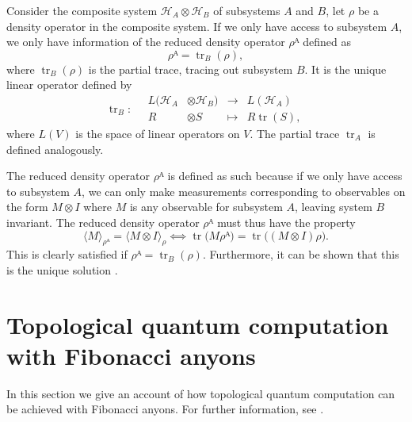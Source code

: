 Consider the composite system $ℋ_A ⊗ ℋ_B$ of subsystems $A$ and $B$, let $ρ$ be a density operator in the composite system. If we only have access to subsystem $A$, we only have information of the reduced density operator $ρᴬ$ defined as
\begin{equation}\label{eq:red dens op}
  ρᴬ = \operatorname{tr}_B(ρ),
\end{equation}
where $\operatorname{tr}_B(ρ)$ is the partial trace, tracing out subsystem $B$. It is the unique linear operator defined by
\begin{equation}
  \operatorname{tr}_B : \quad
  \begin{alignedat}{2}
    L(ℋ_A &⊗ ℋ_B) &{}→{}& L(ℋ_A) \\
    R     &⊗S      &{}↦{}& R\operatorname{tr}(S),
  \end{alignedat}
\end{equation}
where $L(V)$ is the space of linear operators on $V$. The partial trace $\operatorname{tr}_A$ is defined analogously.

The reduced density operator $ρᴬ$ is defined as such because if we only have access to subsystem $A$, we can only make measurements corresponding to observables on the form $M⊗I$ where $M$ is any observable for subsystem $A$, leaving system $B$ invariant. The reduced density operator $ρᴬ$ must thus have the property
\begin{equation}
  ⟨M⟩_{ρᴬ} = ⟨M⊗I⟩_ρ ⟺
  \operatorname{tr}\big(Mρᴬ\big)
  = \operatorname{tr}\big((M⊗I)ρ\big).
\end{equation}
This is clearly satisfied if $ρᴬ = \operatorname{tr}_B(ρ)$. Furthermore, it can be shown that this is the unique solution \cite{nielsen chuang}.













\section{Topological quantum computation with Fibonacci anyons}\label{sec:computing with fibonacci}

In this section we give an account of how topological quantum computation can be achieved with Fibonacci anyons. For further information, see \cite{topological quantum compiling,kitaev fault-tolerant anyons,kauffman lomonaco,wang book,pachos book,asymptotical top compl,slingerland bais}.

